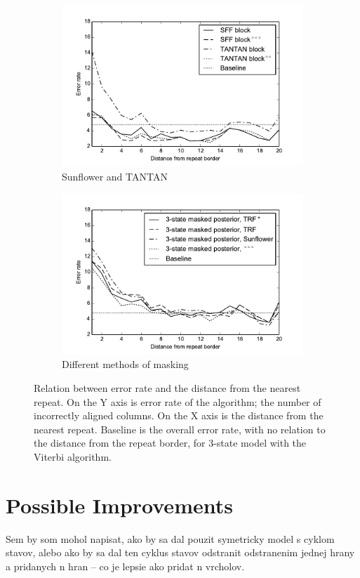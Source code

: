 \begin{figure}
\begin{center}
\begin{subfigure}{0.5\textwidth}
\includegraphics[width=\textwidth]{../figures/error_graph_sffvstantan.pdf}
\caption{Sunflower and TANTAN}\label{FIGURE:SFFTANTAN}
\end{subfigure}%
\begin{subfigure}{0.5\textwidth}
\includegraphics[width=\textwidth]{../figures/error_graph_3statemasking.pdf}
\caption{Different methods of masking}
\end{subfigure}%
\caption{
Relation between error rate and the distance from the nearest repeat. On the Y
axis is error rate of the algorithm; the number of incorrectly aligned columns.
On the X axis is the distance from the nearest repeat. Baseline is the overall
error rate, with no relation to the distance from the repeat border, for
3-state model with the Viterbi algorithm.
}\label{FIGURE:SFF_GRAPHS} 
\end{center}
\end{figure}

\section{Possible Improvements}

\begin{reformulate*}
Sem by som mohol napisat, ako by sa dal pouzit symetricky model s cyklom
stavov, alebo ako by sa dal ten cyklus stavov odstranit odstranenim jednej
hrany a pridanych n hran -- co je lepsie ako pridat n vrcholov.
\end{reformulate*}

\label{LastPage}
